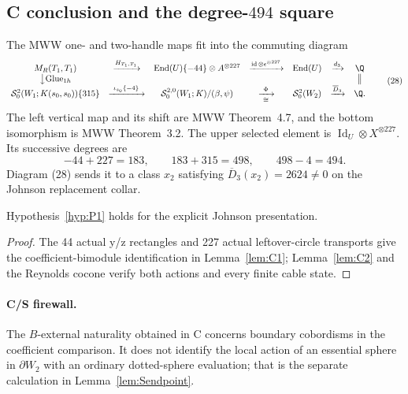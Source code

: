\subsection{C conclusion and the degree-$494$ square}

The MWW one- and two-handle maps fit into the commuting diagram
\[
\begin{array}{ccccccc}
M_R(T_1,T_1)&\xrightarrow{H_{T_1,T_1}}&
\operatorname{End}(U)\{-44\}\otimes A^{\otimes227}
&\xrightarrow{\operatorname{id}\otimes\epsilon^{\otimes227}}&
\operatorname{End}(U)&\xrightarrow{d_3}&\Q\\
\big\downarrow{\mathrm{Glue}_{1h}}&&&&&&\big\Vert\\
\mathcal S^2_0(W_1;K(s_0,s_0))\{315\}
&\xrightarrow{\ \iota_{s_0}\{-4\}\ }&
\mathcal S^{2,0}_0(W_1;K)/(\beta,\psi)
&\xrightarrow[\cong]{\ \Phi\ }&\mathcal S^2_0(W_2)
&\xrightarrow{\overline D_3}&\Q.
\end{array}
\tag{28}
\]
The left vertical map and its shift are MWW Theorem~4.7, and the bottom
isomorphism is MWW Theorem~3.2.  The upper selected element is
$\operatorname{Id}_U\otimes X^{\otimes227}$.  Its successive degrees are
\[
-44+227=183,\qquad183+315=498,\qquad498-4=494.
\]
Diagram (28) sends it to a class $x_2$ satisfying
$\overline D_3(x_2)=2624\ne0$ on the Johnson replacement collar.

\begin{theorem}\label{thm:Cdischarge}
Hypothesis~\ref{hyp:P1} holds for the explicit Johnson presentation.
\end{theorem}

\begin{proof}
The 44 actual y/z rectangles and 227 actual leftover-circle transports give
the coefficient-bimodule identification in Lemma~\ref{lem:C1};
Lemma~\ref{lem:C2} and the Reynolds cocone verify both actions and every
finite cable state.
\end{proof}

\paragraph{C/S firewall.}
The $B$-external naturality obtained in C concerns boundary cobordisms in
the coefficient comparison.  It does not identify the local action of an
essential sphere in $\partial W_2$ with an ordinary dotted-sphere evaluation;
that is the separate calculation in Lemma~\ref{lem:Sendpoint}.
